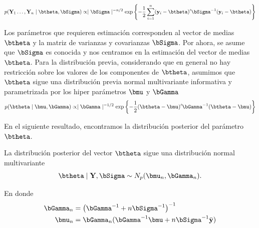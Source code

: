 \documentclass[10pt,openright]{book}\usepackage[]{graphicx}\usepackage[]{color}
\begin{document}
\begin{equation*}\label{Vero_Multi}
  p(\mathbf{Y}_1\ldots,\mathbf{Y}_n \mid \btheta,\bSigma)\propto \mid \bSigma \mid ^{-n/2}
  \exp\left\{-\frac{1}{2}\sum_{i=1}^n(\mathbf{y}_i-\btheta)'\bSigma^{-1}(\mathbf{y}_i-\btheta)\right\}
\end{equation*}
    
Los par\'ametros que requieren estimaci\'on corresponden al vector de medias $\btheta$ y la matriz de varianzas y covarianzas $\bSigma$. Por ahora, se asume que $\bSigma$ es conocida y nos centramos en la estimaci\'on del vector de medias $\btheta$. Para la distribuci\'on previa, considerando que en general no hay restricci\'on sobre los valores de los componentes de $\btheta$, asumimos que $\btheta$ sigue una distribuci\'on previa normal multivariante informativa y parametrizada por los hiper par\'ametros $\bmu$ y $\bGamma$
  \begin{equation*}
p(\btheta \mid \bmu,\bGamma)\propto \mid \bGamma \mid ^{-1/2}
\exp\left\{-\frac{1}{2}(\btheta-\bmu)'\bGamma^{-1}(\btheta-\bmu)\right\}
  \end{equation*}
    
En el siguiente resultado, encontramos la distribuci\'on posterior del par\'ametro $\btheta$.
\begin{Res}\label{res_mu_n}
La distribuci\'on posterior del vector $\btheta$ sigue una distribuci\'on normal multivariante
\begin{equation*}
\btheta \mid \mathbf{Y},\bSigma \sim N_p (\bmu_n,\bGamma_n).
\end{equation*}

En donde
\begin{align}
\bGamma_n &= \left(\bGamma^{-1}+n\bSigma^{-1}\right)^{-1}\label{Gamma_n}\\
\bmu_n &= \bGamma_n(\bGamma^{-1}\bmu+n \bSigma^{-1}\bar{\mathbf{y}})\label{mu_n}
\end{align}
\end{Res}
\end{document}
